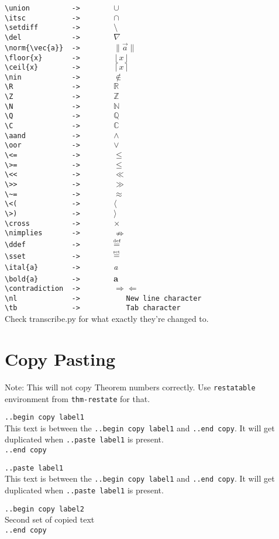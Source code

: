 \documentclass[12pt]{article}
\newcommand{\union}{\cup}
\newcommand{\itsc}{\cap}
\newcommand{\setdiff}{\setminus}
\newcommand{\del}{\nabla}
\newcommand{\Q}{\mathbb{Q}}
\newcommand{\R}{\mathbb{R}}
\newcommand{\Z}{\mathbb{Z}}
\newcommand{\N}{\mathbb{N}}
\newcommand{\C}{\mathbb{C}}
\newcommand{\nin}{\notin}
\newcommand{\ital}{\emph}
\newcommand{\contradiction}{$\Rightarrow\Leftarrow$}
\newcommand{\aand}{\wedge}
\newcommand{\oor}{\vee}
\newcommand{\cross}{\times}
\newcommand{\nimplies}{\nRightarrow}
\newcommand{\nl}{\\}
\newcommand{\tb}{\quad}
\newcommand{\norm}[1]{\|#1\|}
\newcommand{\ddef}{\mathrel{\stackrel{\makebox[0pt]{\mbox{\normalfont\tiny def}}}{=}}}
\newcommand{\sset}{\mathrel{\stackrel{\makebox[0pt]{\mbox{\normalfont\tiny set}}}{=}}}
\newcommand{\floor}[1]{\left\lfloor #1 \right\rfloor}
\newcommand{\ceil}[1]{\left\lceil #1 \right\rceil}
\renewcommand\bold{\textbf}
\begin{document}
\begin{flushleft}
\verb|\union          ->        |$\union$\nl
\verb|\itsc           ->        |$\itsc$\nl
\verb|\setdiff        ->        |$\setdiff$\nl
\verb|\del            ->        |$\del$\nl
\verb|\norm{\vec{a}}  ->        |$\norm{\vec{a}}$\nl
\verb|\floor{x}       ->        |$\floor{x}$\nl
\verb|\ceil{x}        ->        |$\ceil{x}$\nl
\verb|\nin            ->        |$\nin$\nl
\verb|\R              ->        |$\R$\nl
\verb|\Z              ->        |$\Z$\nl
\verb|\N              ->        |$\N$\nl
\verb|\Q              ->        |$\Q$\nl
\verb|\C              ->        |$\C$\nl
\verb|\aand           ->        |$\aand$\nl
\verb|\oor            ->        |$\oor$\nl
\verb|\<=             ->        |$\leq$\nl
\verb|\>=             ->        |$\leq$\nl
\verb|\<<             ->        |$\ll$\nl
\verb|\>>             ->        |$\gg$\nl
\verb|\~=             ->        |$\approx$\nl
\verb|\<(             ->        |$\langle$\nl
\verb|\>)             ->        |$\rangle$\nl
\verb|\cross          ->        |$\cross$\nl
\verb|\nimplies       ->        |$\nimplies$\nl
\verb|\ddef           ->        |$\ddef$\nl
\verb|\sset           ->        |$\sset$\nl
\bigskip
\verb|\ital{a}        ->        |\ital{a}\nl
\verb|\bold{a}        ->        |\bold{a}\nl
\verb|\contradiction  ->        |\contradiction \nl
\verb|\nl             ->           New line character|\nl
\verb|\tb             ->           Tab character|\nl
\bigskip
Check transcribe.py for what exactly they're changed to.

\newpage

\section*{Copy Pasting}
Note: This will not copy Theorem numbers correctly. Use \verb|restatable| environment from \verb|thm-restate| for that.

\bigskip

\verb|..begin copy label1| \nl
This text is between the \verb|..begin copy label1| and \verb|..end copy|. It will get duplicated when \verb|..paste label1| is present. \nl
\verb|..end copy|

\bigskip

\verb|..paste label1| \nl
This text is between the \verb|..begin copy label1| and \verb|..end copy|. It will get duplicated when \verb|..paste label1| is present. \nl

\bigskip

\verb|..begin copy label2| \nl
Second set of copied text \nl
\verb|..end copy|


\end{flushleft}
\end{document}
